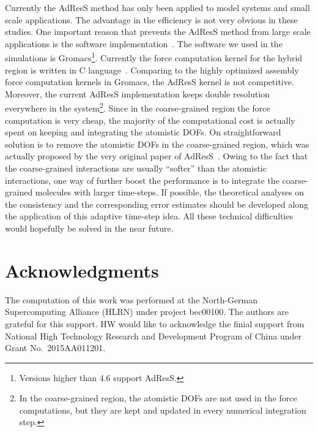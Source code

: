 \documentclass[epjST]{svjour}
\begin{document}

Currently the AdResS method has only been applied to model systems and small scale
applications. The advantage in the efficiency is not very obvious in these studies.
One important reason that prevents the AdResS method from
large scale applications is the software implementation~\cite{agarwal2014chemical}.
The software we used in the simulations is Gromacs\footnote{Versions higher than 4.6 support
AdResS.}.
Currently the force computation kernel for the hybrid region is written in C language~\cite{kernighan1988c}.
Comparing to the highly optimized assembly force computation kernels in Gromacs,
the AdResS kernel is not competitive. Moreover, the current AdResS implementation
keeps double resolution everywhere in the system\footnote{In the coarse-grained region,
  the atomistic DOFs are not used in the force computations, but they are kept and updated
  in every numerical integration step.
}.
Since in the coarse-grained region the force computation is very cheap, the majority
of the computational cost is actually spent on keeping and integrating the atomistic DOFs.
On straightforward solution is to remove the atomistic DOFs in the coarse-grained
region, which was actually proposed by the very original paper of AdResS~\cite{praprotnik2005adaptive}.
Owing to the fact that the coarse-grained interactions are usually ``softer''
than the atomistic interactions, one way of further boost the performance is
to integrate the coarse-grained molecules with larger time-steps.
If possible, the theoretical analyses on the
consistency and the corresponding
error estimates should be developed along the application of this adaptive time-step idea.
All these technical difficulties would hopefully be solved in the near future.


\section*{Acknowledgments}
The computation of this work was performed at the North-German Supercomputing Alliance (HLRN) under project bec00100. The authors are grateful for this support.
HW would like to acknowledge the finial support from National High Technology Research and Development Program of China under Grant No.~2015AA011201.

{}


\end{document}
